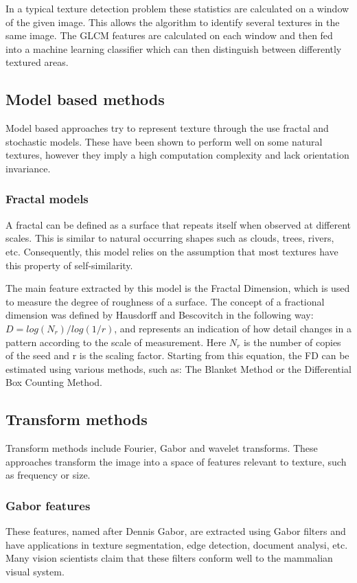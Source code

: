 \documentclass[12pt]{report}
\begin{document}
	In a typical texture detection problem these statistics are calculated on a window of the given image. This allows the algorithm to identify several textures in the same image. The GLCM features are calculated on each window and then fed into a machine learning classifier which can then distinguish between differently textured areas.
	
	\subsection{Model based methods}
	Model based approaches try to represent texture through the use fractal and stochastic models. These have been shown to perform well on some natural textures, however they imply a high computation complexity and lack orientation invariance\cite{texture_analysis_review}.
	
	\subsubsection{Fractal models}
	A fractal can be defined as a surface that repeats itself when observed at different scales. This is similar to natural occurring shapes such as clouds, trees, rivers, etc. Consequently, this model relies on the assumption that most textures have this property of self-similarity\cite{fractal_texture}.
	
	The main feature extracted by this model is the Fractal Dimension, which is used to measure the degree of roughness of a surface. The concept of a fractional dimension was defined by Hausdorff and Bescovitch in the following way: $ D = log(N_r)/log(1/r)$, and represents an indication of how detail changes in a pattern according to the scale of measurement. Here $N_r$ is the number of copies of the seed and r is the scaling factor. Starting from this equation, the FD can be estimated using various methods, such as: The Blanket Method or the Differential Box Counting Method\cite{fractal_texture}.
	
	\subsection{Transform methods}
	Transform methods include Fourier, Gabor and wavelet transforms. These approaches transform the image into a space of features relevant to texture, such as frequency or size\cite{texture_analysis_review}.
	
	\subsubsection{Gabor features}
	These features, named after Dennis Gabor, are extracted using Gabor filters and have applications in texture segmentation, edge detection, document analysi, etc. Many vision scientists claim that these filters conform well to the mammalian visual system\cite{filter_eye_model}.
	
\end{document}
